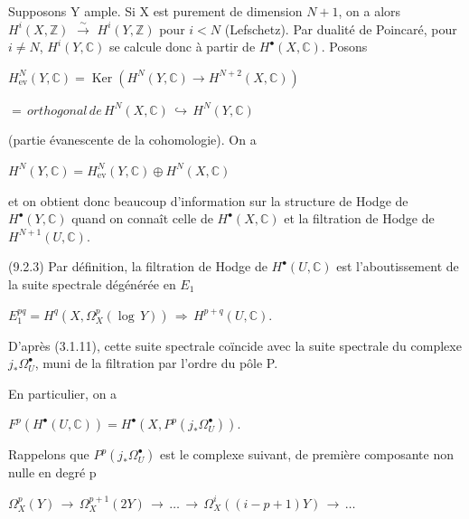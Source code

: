 \documentclass[11pt,twoside]{article}
\newcommand{\DFormula}[1]{%
  \par\smallskip\noindent\hspace*{0pt}\(\displaystyle #1\)\par\smallskip
}
\begin{document}
Supposons Y ample. Si X est purement de dimension \(N+1\), on a alors \(H^{i}(X,\mathbb{Z})\) \(\xrightarrow{\sim }\) \(H^{i}(Y,\mathbb{Z})\) pour \(i<N\) (Lefschetz). Par dualité de Poincaré, pour \(i\neq N\), \(H^{i}(Y,\mathbb{C})\) se calcule donc à partir de \(H^{\bullet }(X,\mathbb{C})\). Posons\par
\par\medskip
\DFormula{H_{\mathrm{ev}}^{N}(Y,\mathbb{C})=\operatorname{Ker}(H^{N}(Y,\mathbb{C})\to H^{N+2}(X,\mathbb{C}))}
\par\medskip
\DFormula{=\,orthogonal\,de\,H^{N}(X,\mathbb{C})\,\hookrightarrow \,H^{N}(Y,\mathbb{C})}
\par\medskip
(partie évanescente de la cohomologie). On a\par
\par\medskip
\DFormula{H^{N}(Y,\mathbb{C})=H_{\mathrm{ev}}^{N}(Y,\mathbb{C})\oplus H^{N}(X,\mathbb{C})}
\par\medskip
et on obtient donc beaucoup d’information sur la structure de Hodge de \(H^{\bullet }(Y,\mathbb{C})\) quand on connaît celle de \(H^{\bullet }(X,\mathbb{C})\) et la filtration de Hodge de \(H^{N+1}(U,\mathbb{C})\).\par
\par\medskip
(9.2.3) Par définition, la filtration de Hodge de \(H^{\bullet }(U,\mathbb{C})\) est l’aboutissement de la suite spectrale dégénérée en \(E_{1}\)\par
\par\medskip
\DFormula{E_{1}^{pq}=H^{q}(X,\Omega _{X}^{p}(\operatorname{log}\,Y))\,\Rightarrow \,H^{p+q}(U,\mathbb{C}).}
\par\medskip
D’après (3.1.11), cette suite spectrale coïncide avec la suite spectrale du complexe \(j_{\ast }\Omega _{U}^{\bullet }\), muni de la filtration par l’ordre du pôle P.\par
\par\medskip
En particulier, on a\par
\par\medskip
\DFormula{F^{p}(H^{\bullet }(U,\mathbb{C}))=H^{\bullet }(X,P^{p}(j_{\ast }\Omega _{U}^{\bullet })).}
\par\medskip
Rappelons que \(P^{p}(j_{\ast }\Omega _{U}^{\bullet })\) est le complexe suivant, de première composante non nulle en degré p\par
\par\medskip
\DFormula{\Omega _{X}^{p}(Y)\,\to \,\Omega _{X}^{p+1}(2Y)\,\to \,…\,\to \,\Omega _{X}^{i}((i−p+1)Y)\,\to \,…}
\par\medskip
\end{document}
